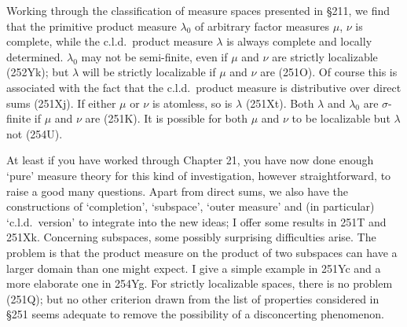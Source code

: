 {Working through the classification of measure spaces presented in
\S211, we find that the primitive product measure $\lambda_0$ of
arbitrary factor measures $\mu$, $\nu$ is complete, while the c.l.d.\
product measure $\lambda$ is always complete and locally determined.
$\lambda_0$ may not be
semi-finite, even if $\mu$ and $\nu$ are strictly localizable
(252Yk);  but $\lambda$ will be strictly localizable if $\mu$ and
$\nu$ are (251O).   Of course this is associated with the fact that the
c.l.d.\ product measure is distributive over direct sums (251Xj).   If
either $\mu$ or $\nu$ is atomless, so is $\lambda$ (251Xt).   Both
$\lambda$ and $\lambda_0$ are $\sigma$-finite if $\mu$
and $\nu$ are (251K).   It is possible for both $\mu$ and $\nu$ to be
localizable but $\lambda$ not (254U).

At least if you have worked through Chapter 21, you have now done enough
`pure' measure theory for this kind of investigation, however
straightforward, to raise a good many questions.   Apart from direct
sums, we also have the constructions of `completion', `subspace', `outer
measure' and (in particular) `c.l.d.\ version' to integrate into the new
ideas;  I offer some results in 251T and 251Xk.   Concerning
subspaces, some possibly surprising difficulties arise.   The problem is
that the
product measure on the product of two subspaces can have a larger domain
than one might expect.   I give a simple example in 251Yc and a more
elaborate one in 254Yg.   For strictly localizable spaces, there is
no problem (251Q);  but no other criterion drawn from the list of
properties considered in \S251 seems adequate to remove the
possibility of a disconcerting phenomenon.

}%

\discrpage

